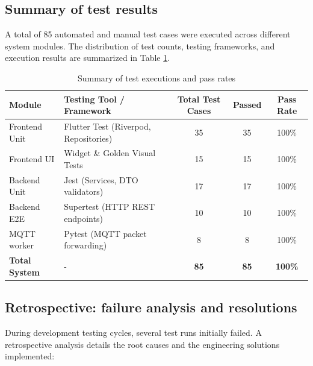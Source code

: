 \documentclass[../Main.tex]{subfiles}
\begin{document}
\subsection{Summary of test results}

A total of 85 automated and manual test cases were executed across different system modules. The distribution of test counts, testing frameworks, and execution results are summarized in Table \ref{table:testing_summary}.

\renewcommand{\arraystretch}{1.3}
\begin{table}[H]
    \centering
    \caption{Summary of test executions and pass rates}
    \label{table:testing_summary}
    \begin{tabularx}{\textwidth}{|l|X|c|c|c|}
        \hline
        \textbf{Module}       & \textbf{Testing Tool / Framework}     & \textbf{Total Test Cases} & \textbf{Passed} & \textbf{Pass Rate} \\
        \hline
        Frontend Unit         & Flutter Test (Riverpod, Repositories) & 35                        & 35              & 100\%              \\
        \hline
        Frontend UI           & Widget \& Golden Visual Tests         & 15                        & 15              & 100\%              \\
        \hline
        Backend Unit          & Jest (Services, DTO validators)       & 17                        & 17              & 100\%              \\
        \hline
        Backend E2E           & Supertest (HTTP REST endpoints)       & 10                        & 10              & 100\%              \\
        \hline
        MQTT worker           & Pytest (MQTT packet forwarding)       & 8                         & 8               & 100\%              \\
        \hline
        \textbf{Total System} & -                                     & \textbf{85}               & \textbf{85}     & \textbf{100\%}     \\
        \hline
    \end{tabularx}
\end{table}

\subsection{Retrospective: failure analysis and resolutions}

During development testing cycles, several test runs initially failed. A retrospective analysis details the root causes and the engineering solutions implemented:
\end{document}
